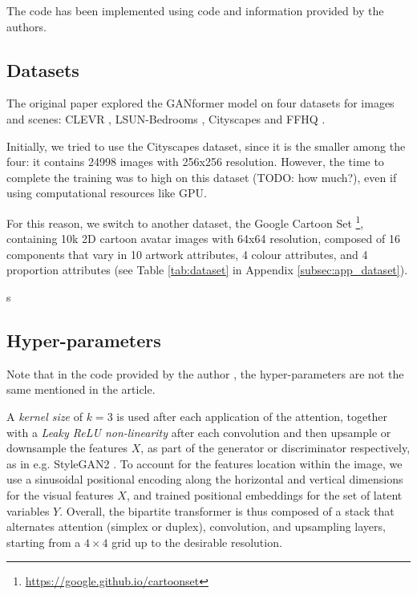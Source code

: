 \documentclass{article}
\begin{document}
	The code has been implemented using code and information provided by the authors.
	
	\subsection{Datasets}	
	The original paper \cite{hudson2021generative} explored the GANformer model on four datasets for 
	images and scenes: CLEVR \cite{johnson2017clevr}, LSUN-Bedrooms \cite{yu2015lsun}, Cityscapes 
	\cite{cordts2016cityscapes} and FFHQ \cite{karras2019style}. 
	
	Initially, we tried to use the Cityscapes dataset, since it is the smaller among the four: it contains 
	24998 images with 256x256 resolution. 
	However, the time to complete the training was to high on this dataset (TODO: how much?), even if 
	using computational resources like GPU.
	
	For this reason, we switch to another dataset, the Google Cartoon Set \cite{cartoonset}\footnote{	
	\url{https://google.github.io/cartoonset}}, containing 10k 2D cartoon avatar 
	images with 64x64 resolution, composed of 16 components that vary in 10 artwork attributes, 4 
	colour attributes, and 4 proportion attributes (see Table \ref{tab:dataset} in Appendix 
	\ref{subsec:app_dataset}). 

s
	\subsection{Hyper-parameters}\label{sec:hyperparam}%
	
	Note that in the code provided by the author \cite{hudson2021generative}, the hyper-parameters are 
	not the same mentioned in the article. 
	
	A \textit{kernel size} of $k = 3$ is used after each application of the attention, together with a 
	\textit{Leaky ReLU non-linearity} after each convolution and then upsample or downsample the 
	features $X$, as part of the generator or discriminator respectively, as in e.g. StyleGAN2 
	\cite{karras2020analyzing}. 
	To account for the features location within the image, we use a sinusoidal positional encoding along 
	the horizontal and vertical dimensions for the visual features $X$, and trained positional 
	embeddings for the set of latent variables $Y$.
	Overall, the bipartite transformer is thus composed of a stack that alternates attention (simplex or 
	duplex), convolution, and upsampling layers, starting from a $4 \times 4$ grid up to the desirable 
	resolution. 
	
\end{document}
